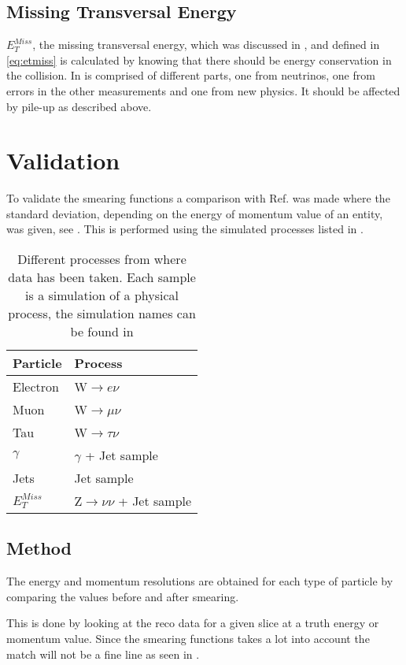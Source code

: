 \subsection{Missing Transversal Energy}
$E_T^{Miss}$, the missing transversal energy, which was discussed in , and defined in \eqref{eq:etmiss} is calculated by knowing that there should be energy conservation in the collision. In is comprised of different parts, one from neutrinos, one from errors in the other measurements and one from new physics. It should be affected by pile-up as described above.

\newpage
\section{Validation}\label{sec:vali}
To validate the smearing functions a comparison with Ref. \citep{ATL-PHYS-PUB-2013-004} was made where the standard deviation, depending on the energy of momentum value of an entity, was given, see . This is performed using the simulated processes listed in . 
\begin{SCtable}[][ht]
\begin{tabular}{|l|l|}
\hline
Particle & Process \\ \hline
Electron & W$\rightarrow e\nu$ \\
Muon & W$\rightarrow \mu \nu$ \\
Tau & W$\rightarrow \tau \nu$ \\
$\gamma$ & $\gamma$ + Jet sample \\
Jets & Jet sample \\
$E_T^{Miss}$ & Z$\rightarrow \nu \nu$ + Jet sample \\ \hline
\end{tabular}
\caption{Different processes from where data has been taken. Each sample is a simulation of a physical process, the simulation names can be found in }
\label{tab:backproc}
\end{SCtable}

\subsection{Method}
The energy and momentum resolutions are obtained for each type of particle by comparing the values before and after smearing.

This is done by looking at the reco data for a given slice at a truth energy or momentum value. Since the smearing functions takes a lot into account the match will not be a fine line as seen in .

